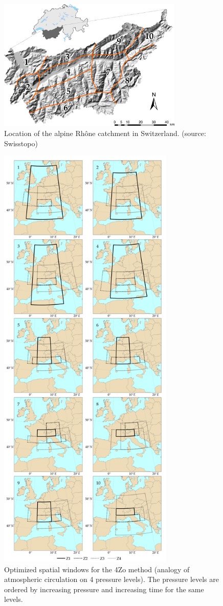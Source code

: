 \documentclass[review]{elsarticle}
\begin{document}
\begin{figure}[t]
	\centerline{\includegraphics[width=8.8cm]{figures/fig01.pdf}}
	\caption{Location of the alpine Rh\^{o}ne catchment in Switzerland. (source: Swisstopo)}
	\label{fig:map}
\end{figure}


\begin{figure}[t]
	\centerline{\includegraphics[width=8.4cm]{figures/fig02.pdf}}
	\caption{Optimized spatial windows for the 4Zo method (analogy of atmospheric circulation on 4 pressure levels). The pressure levels are ordered by increasing pressure and increasing time for the same levels.}
	\label{fig:spatial_windows_4Zo}
\end{figure}
\end{document}
